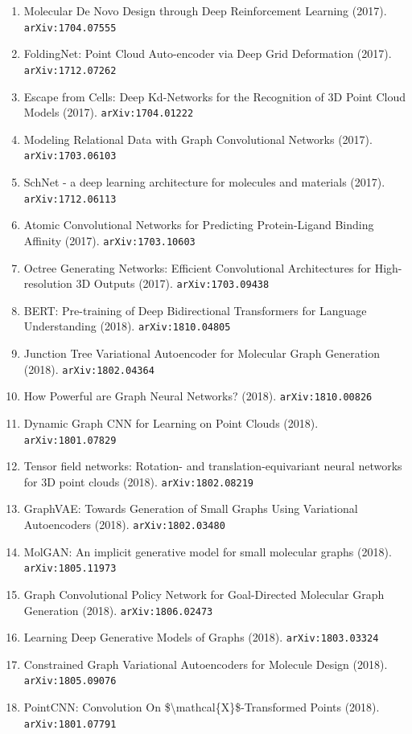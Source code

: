 \documentclass[11pt]{article}
\begin{document}
\begin{enumerate}
  \item Molecular De Novo Design through Deep Reinforcement Learning (2017). \texttt{arXiv:1704.07555}
  \item FoldingNet: Point Cloud Auto-encoder via Deep Grid Deformation (2017). \texttt{arXiv:1712.07262}
  \item Escape from Cells: Deep Kd-Networks for the Recognition of 3D Point
  Cloud Models (2017). \texttt{arXiv:1704.01222}
  \item Modeling Relational Data with Graph Convolutional Networks (2017). \texttt{arXiv:1703.06103}
  \item SchNet - a deep learning architecture for molecules and materials (2017). \texttt{arXiv:1712.06113}
  \item Atomic Convolutional Networks for Predicting Protein-Ligand Binding
  Affinity (2017). \texttt{arXiv:1703.10603}
  \item Octree Generating Networks: Efficient Convolutional Architectures for
  High-resolution 3D Outputs (2017). \texttt{arXiv:1703.09438}
  \item BERT: Pre-training of Deep Bidirectional Transformers for Language
  Understanding (2018). \texttt{arXiv:1810.04805}
  \item Junction Tree Variational Autoencoder for Molecular Graph Generation (2018). \texttt{arXiv:1802.04364}
  \item How Powerful are Graph Neural Networks? (2018). \texttt{arXiv:1810.00826}
  \item Dynamic Graph CNN for Learning on Point Clouds (2018). \texttt{arXiv:1801.07829}
  \item Tensor field networks: Rotation- and translation-equivariant neural
  networks for 3D point clouds (2018). \texttt{arXiv:1802.08219}
  \item GraphVAE: Towards Generation of Small Graphs Using Variational
  Autoencoders (2018). \texttt{arXiv:1802.03480}
  \item MolGAN: An implicit generative model for small molecular graphs (2018). \texttt{arXiv:1805.11973}
  \item Graph Convolutional Policy Network for Goal-Directed Molecular Graph
  Generation (2018). \texttt{arXiv:1806.02473}
  \item Learning Deep Generative Models of Graphs (2018). \texttt{arXiv:1803.03324}
  \item Constrained Graph Variational Autoencoders for Molecule Design (2018). \texttt{arXiv:1805.09076}
  \item PointCNN: Convolution On \$\textbackslash{}mathcal\{X\}\$-Transformed Points (2018). \texttt{arXiv:1801.07791}

\end{enumerate}
\end{document}
